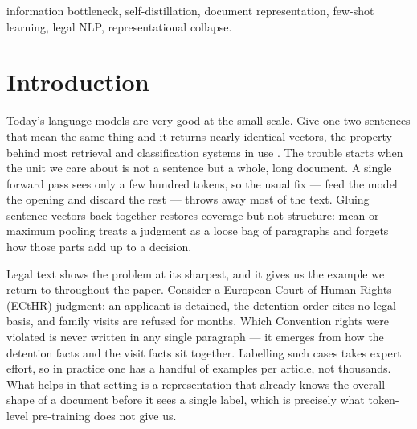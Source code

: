 \documentclass[conference]{IEEEtran}
\begin{document}
\begin{IEEEkeywords}
information bottleneck, self-distillation, document representation, few-shot
learning, legal NLP, representational collapse.
\end{IEEEkeywords}

\section{Introduction}
Today's language models are very good at the small scale. Give one two sentences
that mean the same thing and it returns nearly identical vectors, the property
behind most retrieval and classification systems in use \cite{liu2019roberta}. The
trouble starts when the unit we care about is not a sentence but a whole, long
document. A single forward pass sees only a few hundred tokens, so the usual fix
--- feed the model the opening and discard the rest --- throws away most of the
text. Gluing sentence vectors back together restores coverage but not structure:
mean or maximum pooling treats a judgment as a loose bag of paragraphs and forgets
how those parts add up to a decision.

Legal text shows the problem at its sharpest, and it gives us the example we return
to throughout the paper. Consider a European Court of Human Rights (ECtHR)
judgment: an applicant is detained, the detention order cites no legal basis, and
family visits are refused for months. Which Convention rights were violated is
never written in any single paragraph --- it emerges from how the detention facts
and the visit facts sit together. Labelling such cases takes expert effort, so in
practice one has a handful of examples per article, not thousands. What helps in
that setting is a representation that already knows the overall shape of a document
before it sees a single label, which is precisely what token-level pre-training
does not give us.
\end{document}
